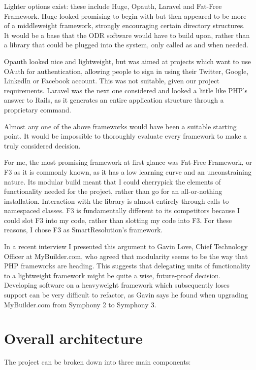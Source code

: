 Lighter options exist: these include Huge, Opauth, Laravel and Fat-Free Framework. Huge looked promising to begin with but then appeared to be more of a middleweight framework, strongly encouraging certain directory structures. It would be a base that the ODR software would have to build upon, rather than a library that could be plugged into the system, only called as and when needed.

Opauth looked nice and lightweight, but was aimed at projects which want to use OAuth for authentication, allowing people to sign in using their Twitter, Google, LinkedIn or Facebook account. This was not suitable, given our project requirements. Laravel was the next one considered and looked a little like PHP's answer to Rails, as it generates an entire application structure through a proprietary command.

Almost any one of the above frameworks would have been a suitable starting point. It would be impossible to thoroughly evaluate every framework to make a truly considered decision.

For me, the most promising framework at first glance was Fat-Free Framework, or F3 as it is commonly known, as it has a low learning curve and an unconstraining nature. Its modular build meant that I could cherrypick the elements of functionality needed for the project, rather than go for an all-or-nothing installation. Interaction with the library is almost entirely through calls to namespaced classes. F3 is fundamentally different to its competitors because I could slot F3 into my code, rather than slotting my code into F3. For these reasons, I chose F3 as SmartResolution's framework.

In a recent interview I presented this argument to Gavin Love, Chief Technology Officer at MyBuilder.com, who agreed that modularity seems to be the way that PHP frameworks are heading. This suggests that delegating units of functionality to a lightweight framework might be quite a wise, future-proof decision. Developing software on a heavyweight framework which subsequently loses support can be very difficult to refactor, as Gavin says he found when upgrading MyBuilder.com from Symphony 2 to Symphony 3.

\section{Overall architecture}

The project can be broken down into three main components:

